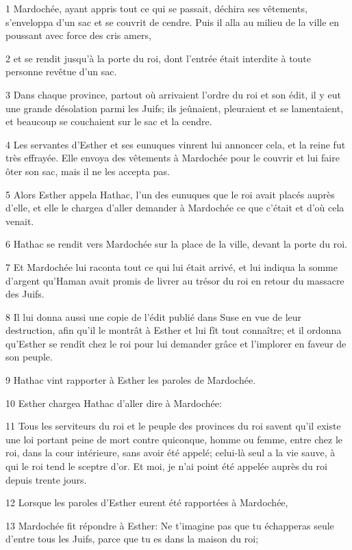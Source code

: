 \par 1 Mardochée, ayant appris tout ce qui se passait, déchira ses vêtements, s'enveloppa d'un sac et se couvrit de cendre. Puis il alla au milieu de la ville en poussant avec force des cris amers,
\par 2 et se rendit jusqu'à la porte du roi, dont l'entrée était interdite à toute personne revêtue d'un sac.
\par 3 Dans chaque province, partout où arrivaient l'ordre du roi et son édit, il y eut une grande désolation parmi les Juifs; ils jeûnaient, pleuraient et se lamentaient, et beaucoup se couchaient sur le sac et la cendre.
\par 4 Les servantes d'Esther et ses eunuques vinrent lui annoncer cela, et la reine fut très effrayée. Elle envoya des vêtements à Mardochée pour le couvrir et lui faire ôter son sac, mais il ne les accepta pas.
\par 5 Alors Esther appela Hathac, l'un des eunuques que le roi avait placés auprès d'elle, et elle le chargea d'aller demander à Mardochée ce que c'était et d'où cela venait.
\par 6 Hathac se rendit vers Mardochée sur la place de la ville, devant la porte du roi.
\par 7 Et Mardochée lui raconta tout ce qui lui était arrivé, et lui indiqua la somme d'argent qu'Haman avait promis de livrer au trésor du roi en retour du massacre des Juifs.
\par 8 Il lui donna aussi une copie de l'édit publié dans Suse en vue de leur destruction, afin qu'il le montrât à Esther et lui fît tout connaître; et il ordonna qu'Esther se rendît chez le roi pour lui demander grâce et l'implorer en faveur de son peuple.
\par 9 Hathac vint rapporter à Esther les paroles de Mardochée.
\par 10 Esther chargea Hathac d'aller dire à Mardochée:
\par 11 Tous les serviteurs du roi et le peuple des provinces du roi savent qu'il existe une loi portant peine de mort contre quiconque, homme ou femme, entre chez le roi, dans la cour intérieure, sans avoir été appelé; celui-là seul a la vie sauve, à qui le roi tend le sceptre d'or. Et moi, je n'ai point été appelée auprès du roi depuis trente jours.
\par 12 Lorsque les paroles d'Esther eurent été rapportées à Mardochée,
\par 13 Mardochée fit répondre à Esther: Ne t'imagine pas que tu échapperas seule d'entre tous les Juifs, parce que tu es dans la maison du roi;
